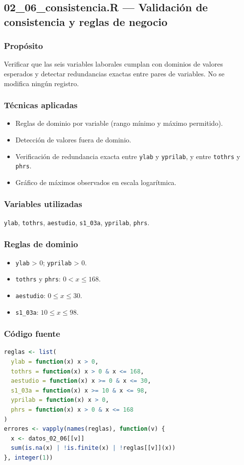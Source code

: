 \documentclass[12pt,a4paper]{article}
\begin{document}
\subsection{02\_06\_consistencia.R --- Validación de consistencia y reglas de negocio}

\subsubsection{Propósito}
Verificar que las seis variables laborales cumplan con dominios de valores esperados y detectar redundancias exactas entre pares de variables. No se modifica ningún registro.

\subsubsection{Técnicas aplicadas}
\begin{itemize}
  \item Reglas de dominio por variable (rango mínimo y máximo permitido).
  \item Detección de valores fuera de dominio.
  \item Verificación de redundancia exacta entre \texttt{ylab} y \texttt{yprilab}, y entre \texttt{tothrs} y \texttt{phrs}.
  \item Gráfico de máximos observados en escala logarítmica.
\end{itemize}

\subsubsection{Variables utilizadas}
\texttt{ylab}, \texttt{tothrs}, \texttt{aestudio}, \texttt{s1\_03a}, \texttt{yprilab}, \texttt{phrs}.

\subsubsection{Reglas de dominio}
\begin{itemize}
  \item \texttt{ylab} > 0; \texttt{yprilab} > 0.
  \item \texttt{tothrs} y \texttt{phrs}: $0 < x \le 168$.
  \item \texttt{aestudio}: $0 \le x \le 30$.
  \item \texttt{s1\_03a}: $10 \le x \le 98$.
\end{itemize}

\subsubsection{Código fuente}
\begin{lstlisting}[style=Rstyle,language=R]
reglas <- list(
  ylab = function(x) x > 0,
  tothrs = function(x) x > 0 & x <= 168,
  aestudio = function(x) x >= 0 & x <= 30,
  s1_03a = function(x) x >= 10 & x <= 98,
  yprilab = function(x) x > 0,
  phrs = function(x) x > 0 & x <= 168
)
errores <- vapply(names(reglas), function(v) {
  x <- datos_02_06[[v]]
  sum(is.na(x) | !is.finite(x) | !reglas[[v]](x))
}, integer(1))
\end{lstlisting}
\end{document}
